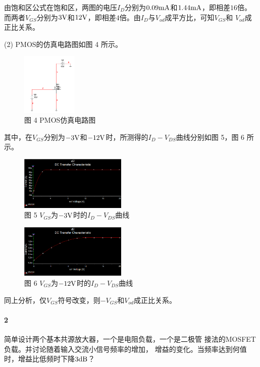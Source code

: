 \documentclass[hyperref, UTF8]{ctexart}
\newcommand{\volt}{{\rm V}}
\newcommand{\milliampere}{{\rm mA}}
\newcommand{\decibel}{{\rm dB}}
\begin{document}
由饱和区公式在饱和区，两图的电压$I_{D}$分别为$0.09\milliampere$和$1.44\milliampere$，即相差$16$倍。
而两者$V_{GS}$分别为$3\volt$和$12\volt$，即相差$4$倍。由$I_D$与$V_{od}$成平方比，可知$V_{GS}$和
$V_{od}$成正比关系。

(2) PMOS的仿真电路图如图 4 所示。
\begin{figure}[!htb]
    \centering
    \includegraphics[width=0.236\textwidth]{cir1-2.png}
    \caption*{图 4 PMOS仿真电路图}
\end{figure}
其中，在$V_{GS}$分别为$-3\volt$和$-12\volt$时，所测得的$I_D-V_{DS}$曲线分别如图 5，图 6 所示。

\begin{figure}[!htb]
    \centering
    \includegraphics[width=0.453\textwidth]{res1-2-1.png}
    \caption*{图 5 $V_{GS}$为$-3\volt$时的$I_D-V_{DS}$曲线}
    \end{figure}

\begin{figure}[!htb]
    \centering
    \includegraphics[width=0.454\textwidth]{res1-2-2.png}
    \caption*{图 6 $V_{GS}$为$-12\volt$时的$I_D-V_{DS}$曲线}
\end{figure}
同上分析，仅$V_{GS}$符号改变，则$-V_{GS}$和$V_{od}$成正比关系。

\newpage 

\paragraph{2}
简单设计两个基本共源放大器，一个是电阻负载，一个是二极管
接法的MOSFET负载。并讨论随着输入交流小信号频率的增加，
增益的变化。当频率达到何值时，增益比低频时下降$3\decibel$？
\end{document}
